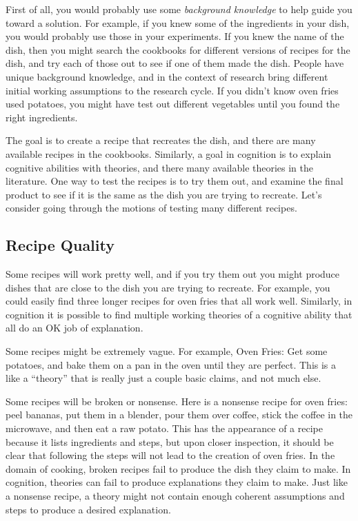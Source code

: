\documentclass[
  oneside,
  12pt]{crumpbook}
\begin{document}
First of all, you would probably use some \emph{background knowledge} to help guide you toward a solution. For example, if you knew some of the ingredients in your dish, you would probably use those in your experiments. If you knew the name of the dish, then you might search the cookbooks for different versions of recipes for the dish, and try each of those out to see if one of them made the dish. People have unique background knowledge, and in the context of research bring different initial working assumptions to the research cycle. If you didn't know oven fries used potatoes, you might have test out different vegetables until you found the right ingredients.

The goal is to create a recipe that recreates the dish, and there are many available recipes in the cookbooks. Similarly, a goal in cognition is to explain cognitive abilities with theories, and there many available theories in the literature. One way to test the recipes is to try them out, and examine the final product to see if it is the same as the dish you are trying to recreate. Let's consider going through the motions of testing many different recipes.

\hypertarget{recipe-quality}{%
\subsection{Recipe Quality}\label{recipe-quality}}

Some recipes will work pretty well, and if you try them out you might produce dishes that are close to the dish you are trying to recreate. For example, you could easily find three longer recipes for oven fries that all work well. Similarly, in cognition it is possible to find multiple working theories of a cognitive ability that all do an OK job of explanation.

Some recipes might be extremely vague. For example, Oven Fries: Get some potatoes, and bake them on a pan in the oven until they are perfect. This is a like a ``theory'' that is really just a couple basic claims, and not much else.

Some recipes will be broken or nonsense. Here is a nonsense recipe for oven fries: peel bananas, put them in a blender, pour them over coffee, stick the coffee in the microwave, and then eat a raw potato. This has the appearance of a recipe because it lists ingredients and steps, but upon closer inspection, it should be clear that following the steps will not lead to the creation of oven fries. In the domain of cooking, broken recipes fail to produce the dish they claim to make. In cognition, theories can fail to produce explanations they claim to make. Just like a nonsense recipe, a theory might not contain enough coherent assumptions and steps to produce a desired explanation.
\end{document}
